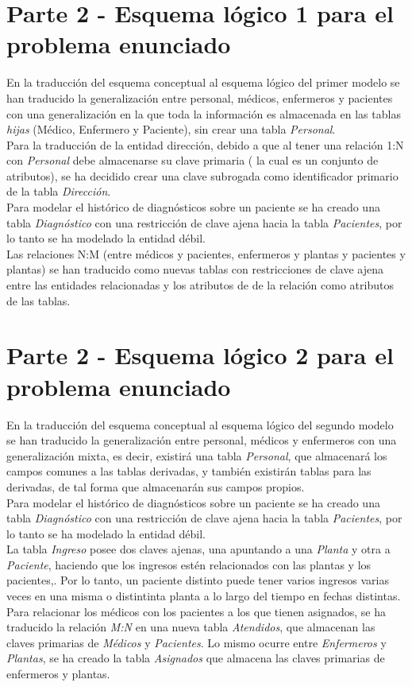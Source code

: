 \documentclass{article}
\begin{document}
\newpage
\section{Parte 2 - Esquema lógico 1 para el problema enunciado}

En la traducción del esquema conceptual al esquema lógico del primer modelo se han traducido la generalización entre personal, médicos, enfermeros y pacientes con una generalización en la que toda la información es almacenada en las tablas \emph{hijas} (Médico, Enfermero y Paciente), sin crear una tabla \emph{Personal}.\\
Para la traducción de la entidad dirección, debido a que al tener una relación 1:N con \emph{Personal} debe almacenarse su clave primaria ( la cual es un conjunto de atributos), se ha decidido crear una clave subrogada como identificador primario de la tabla \emph{Dirección}.\\
Para modelar el histórico de diagnósticos sobre un paciente se ha creado una tabla \emph{Diagnóstico} con una restricción de clave ajena hacia la tabla \emph{Pacientes}, por lo tanto se ha modelado la entidad débil.\\
Las relaciones N:M (entre médicos y pacientes, enfermeros y plantas y pacientes y plantas) se han traducido como nuevas tablas con restricciones de clave ajena entre las entidades relacionadas y los atributos de de la relación como atributos de las tablas.

\section{Parte 2 - Esquema lógico 2 para el problema enunciado}

En la traducción del esquema conceptual al esquema lógico del segundo modelo se han traducido la generalización entre personal, médicos y enfermeros con una generalización mixta, es decir, existirá una tabla \emph{Personal}, que almacenará los campos comunes a las tablas derivadas, y también existirán tablas para las derivadas, de tal forma que almacenarán sus campos propios.\\
Para modelar el histórico de diagnósticos sobre un paciente se ha creado una tabla \emph{Diagnóstico} con una restricción de clave ajena hacia la tabla \emph{Pacientes}, por lo tanto se ha modelado la entidad débil.\\
La tabla \emph{Ingreso} posee dos claves ajenas, una apuntando a una \emph{Planta} y otra a \emph{Paciente}, haciendo que los ingresos estén relacionados con las plantas y los pacientes,. Por lo tanto, un paciente distinto puede tener varios ingresos varias veces en una misma o distintinta planta a lo largo del tiempo en fechas distintas.\\
Para relacionar los médicos con los pacientes a los que tienen asignados, se ha traducido la relación \emph{M:N} en una nueva tabla \emph{Atendidos}, que almacenan las claves primarias de \emph{Médicos} y \emph{Pacientes}. Lo mismo ocurre entre \emph{Enfermeros} y \emph{Plantas}, se ha creado la tabla \emph{Asignados} que almacena las claves primarias de enfermeros y plantas.\\
\end{document}
